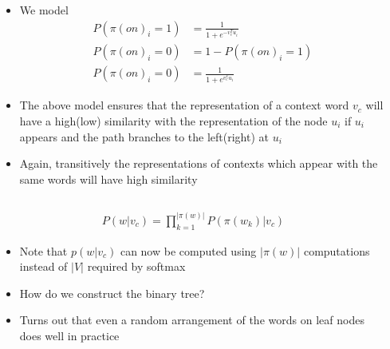 \begin{frame}
	\begin{columns}
		\begin{overlayarea}{\textwidth}{\textheight}
			
		\end{overlayarea}
		\begin{overlayarea}{\textwidth}{\textheight}
			\footnotesize{
				\begin{itemize}
					\justifying
						\item<1-> We model
						    \begin{align*}
							    P(\pi(on)_i = 1) & = \frac{1}{1 + e^{-v_c^{T}u_i}} \\
							    P(\pi(on)_i = 0) & = 1 - P(\pi(on)_i = 1)          \\
							    P(\pi(on)_i = 0) & = \frac{1}{1 + e^{v_c^{T}u_i}}
						    \end{align*}

					\item<2-> The above model ensures that the representation
					      of a context word $v_c$ will have a high(low) similarity
					      with the representation of the node $u_i$ if $u_i$ appears
					      and the path branches to the left(right) at $u_i$
					\item<3-> Again, transitively the representations of contexts
					      which appear with the same words will have high similarity
				\end{itemize}
			}
		\end{overlayarea}
	\end{columns}
\end{frame}


\begin{frame}
	\begin{columns}
		\column{0.5\textwidth}
		\begin{overlayarea}{\textwidth}{\textheight}
			
		\end{overlayarea}
		\column{0.5\textwidth}
		\begin{overlayarea}{\textwidth}{\textheight}
			\vspace{0.1in}
			\begin{align*}
				P(w|v_c) = \prod\limits_{k=1}^{|\pi(w)|}P(\pi(w_k)|v_c)
			\end{align*}
			\begin{itemize}
				\justifying
				\item<2-> Note that $p(w|v_c)$ can now be computed using
				      $|\pi(w)|$ computations instead of $|V|$ required by softmax
				\item<3-> How do we construct the binary tree?
				\item<4-> Turns out that even a random arrangement of the
				      words on leaf nodes does well in practice
			\end{itemize}
		\end{overlayarea}
	\end{columns}
\end{frame}
